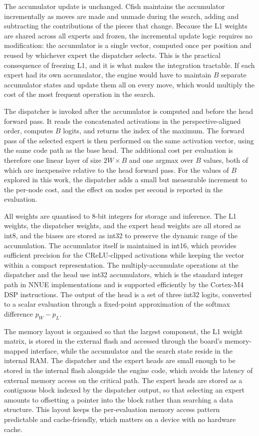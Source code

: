 The accumulator update is unchanged. Cfish maintains the accumulator incrementally as moves are made and unmade during the search, adding and subtracting the contributions of the pieces that change. Because the L1 weights are shared across all experts and frozen, the incremental update logic requires no modification: the accumulator is a single vector, computed once per position and reused by whichever expert the dispatcher selects. This is the practical consequence of freezing L1, and it is what makes the integration tractable. If each expert had its own accumulator, the engine would have to maintain \(B\) separate accumulator states and update them all on every move, which would multiply the cost of the most frequent operation in the search.

The dispatcher is invoked after the accumulator is computed and before the head forward pass. It reads the concatenated activations in the perspective-aligned order, computes \(B\) logits, and returns the index of the maximum. The forward pass of the selected expert is then performed on the same activation vector, using the same code path as the base head. The additional cost per evaluation is therefore one linear layer of size \(2W \times B\) and one argmax over \(B\) values, both of which are inexpensive relative to the head forward pass. For the values of \(B\) explored in this work, the dispatcher adds a small but measurable increment to the per-node cost, and the effect on nodes per second is reported in the evaluation.

All weights are quantised to 8-bit integers for storage and inference. The L1 weights, the dispatcher weights, and the expert head weights are all stored as int8, and the biases are stored as int32 to preserve the dynamic range of the accumulation. The accumulator itself is maintained in int16, which provides sufficient precision for the CReLU-clipped activations while keeping the vector within a compact representation. The multiply-accumulate operations at the dispatcher and the head use int32 accumulators, which is the standard integer path in NNUE implementations and is supported efficiently by the Cortex-M4 DSP instructions. The output of the head is a set of three int32 logits, converted to a scalar evaluation through a fixed-point approximation of the softmax difference \(p_W - p_L\).

The memory layout is organised so that the largest component, the L1 weight matrix, is stored in the external flash and accessed through the board's memory-mapped interface, while the accumulator and the search state reside in the internal RAM. The dispatcher and the expert heads are small enough to be stored in the internal flash alongside the engine code, which avoids the latency of external memory access on the critical path. The expert heads are stored as a contiguous block indexed by the dispatcher output, so that selecting an expert amounts to offsetting a pointer into the block rather than searching a data structure. This layout keeps the per-evaluation memory access pattern predictable and cache-friendly, which matters on a device with no hardware cache.

